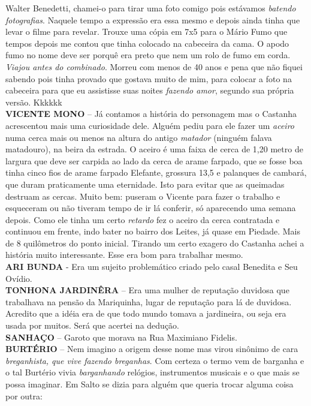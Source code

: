 \documentclass[12pt,brazil,]{book}
\begin{document}
Walter Benedetti, chamei-o para tirar uma foto comigo pois estávamos
\emph{batendo fotografias}. Naquele tempo a expressão era essa mesmo e
depois ainda tinha que levar o filme para revelar. Trouxe uma cópia em
7x5 para o Mário Fumo que tempos depois me contou que tinha colocado na
cabeceira da cama. O apodo fumo no nome deve ser porquê era preto que
nem um rolo de fumo em corda. \emph{Viajou antes do combinado}. Morreu
com menos de 40 anos e pena que não fiquei sabendo pois tinha provado
que gostava muito de mim, para colocar a foto na cabeceira para que eu
assistisse suas noites \emph{fazendo amor}, segundo sua própria versão.
Kkkkkk\\
\textbf{VICENTE MONO} -- Já contamos a história do personagem mas o
Castanha acrescentou mais uma curiosidade dele. Alguém pediu para ele
fazer um \emph{aceiro} numa cerca mais ou menos na altura do antigo
\emph{matador} (ninguém falava matadouro), na beira da estrada. O aceiro
é uma faixa de cerca de 1,20 metro de largura que deve ser carpida ao
lado da cerca de arame farpado, que se fosse boa tinha cinco fios de
arame farpado Elefante, grossura 13,5 e palanques de cambará, que duram
praticamente uma eternidade. Isto para evitar que as queimadas destruam
as cercas. Muito bem: puseram o Vicente para fazer o trabalho e
esqueceram ou não tiveram tempo de ir lá conferir, só aparecendo uma
semana depois. Como ele tinha um certo \emph{retardo} fez o aceiro da
cerca contratada e continuou em frente, indo bater no bairro dos Leites,
já quase em Piedade. Mais de 8 quilômetros do ponto inicial. Tirando um
certo exagero do Castanha achei a história muito interessante. Esse era
bom para trabalhar mesmo.\\
\textbf{ARI BUNDA} - Era um sujeito problemático criado pelo casal
Benedita e Seu Ovídio.\\
\textbf{TONHONA JARDINÊRA} -- Era uma mulher de reputação duvidosa que
trabalhava na pensão da Mariquinha, lugar de reputação para lá de
duvidosa. Acredito que a idéia era de que todo mundo tomava a
jardineira, ou seja era usada por muitos. Será que acertei na dedução.\\
\textbf{SANHAÇO} -- Garoto que morava na Rua Maximiano Fidelis.\\
\textbf{BURTÉRIO} -- Nem imagino a origem desse nome mas virou sinônimo
de cara \emph{breganhista, que vive fazendo breganhas}. Com certeza o
termo vem de barganha e o tal Burtério vivia \emph{barganhando}
relógios, instrumentos musicais e o que mais se possa imaginar. Em Salto
se dizia para alguém que queria trocar alguma coisa por outra:
\end{document}
